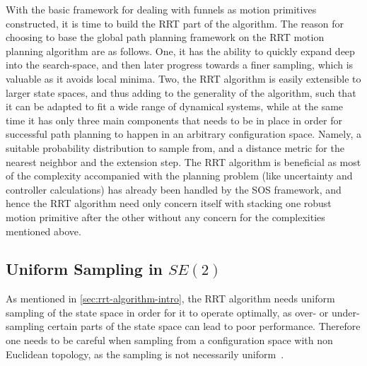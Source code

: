 With the basic framework for dealing with funnels as motion primitives
constructed, it is time to build the \ac{RRT} part of the \rrtfunnel{}
algorithm. The reason for choosing to base the global path planning framework on
the \ac{RRT} motion planning algorithm are as follows. One, it has the ability
to quickly expand deep into the search-space, and then later progress towards a
finer sampling, which is valuable as it avoids local minima. Two, the \ac{RRT}
algorithm is easily extensible to larger state spaces, and thus adding to the
generality of the \rrtfunnel{} algorithm, such that it can be adapted to fit a
wide range of dynamical systems, while at the same time it has only three main
components that needs to be in place in order for successful path planning to
happen in an arbitrary configuration space. Namely, a suitable probability
distribution to sample from, and a distance metric for the nearest neighbor and
the extension step. The \ac{RRT} algorithm is beneficial as most of the
complexity accompanied with the planning problem (like uncertainty and
controller calculations) has already been handled by the \ac{SOS} framework, and
hence the \ac{RRT} algorithm need only concern itself with stacking one robust
motion primitive after the other without any concern for the complexities
mentioned above.

\subsection{Uniform Sampling in \(SE(2)\)}

As mentioned in \cref{sec:rrt-algorithm-intro}, the \ac{RRT} algorithm
needs uniform sampling of the state space in order for it to operate optimally,
as over- or under-sampling certain parts of the state space can lead to poor
performance. Therefore one needs to be careful when sampling from a
configuration space with non Euclidean topology, as the sampling is not
necessarily uniform~\cite{kuffnerEffectiveSamplingDistance2004}.

